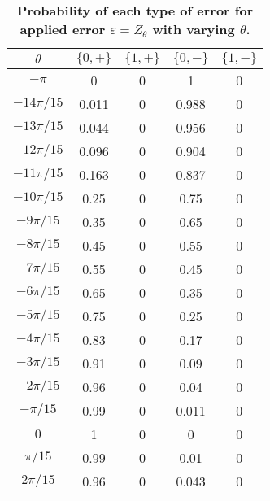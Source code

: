 \documentclass[superscriptaddress,twocolumn,showpacs,prb]{revtex4-1}
\begin{document}
\begin{table}[h!]
\begin{center}
 \begin{tabular}{c c c c c} 
 \hline
 \hline
 $\theta$ & $\{0 , +\}$ & $\{1 , +\}$&$\{0 , -\}$&$\{1 , -\}$ \\ [0.5ex] 
 \hline
 \hline
 $-\pi$ &0 &0 &1&0   \\ 
 \hline
 $-14\pi/15$ &0.011 &0&0.988&0  \\
 \hline
 $-13\pi/15$ & 0.044&0&0.956&0\\
 \hline
 $-12\pi/15$ & 0.096&0&0.904&0   \\  
\hline
 $-11\pi/15$ & 0.163&0&0.837&0   \\ 
 \hline
 $-10\pi/15$ & 0.25&0&0.75&0 \\
 \hline
  $-9\pi/15$&0.35&0&0.65&0\\
  \hline
  $-8\pi/15$&0.45&0&0.55&0\\
  \hline
  $-7\pi/15$&0.55&0&0.45&0\\
  \hline
  $-6\pi/15$&0.65&0&0.35&0\\
  \hline
  $-5\pi/15$&0.75&0&0.25&0\\
  \hline
  $-4\pi/15$&0.83&0&0.17&0\\
  \hline
  $-3\pi/15$&0.91&0&0.09&0\\
  \hline
  $-2\pi/15$&0.96&0&0.04&0\\
  \hline
  $-\pi/15$&0.99&0&0.011&0\\
  \hline
  $0$&1&0&0&0\\
  \hline
  $\pi/15$&0.99&0&0.01&0\\
  \hline
 $2\pi/15$&0.96&0&0.043&0\\
  [1ex] 
 \hline
 \hline
\end{tabular}
\caption{\textbf{Probability of each type of error for applied error $\varepsilon=Z_{\theta}$ with varying $\theta$.}}
\label{qed_table6}
\end{center}
\end{table}
\end{document}
